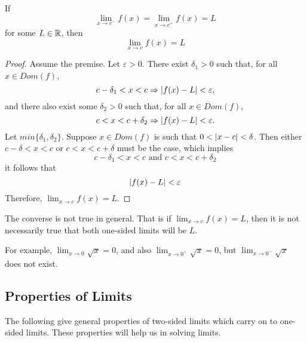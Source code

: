 \begin{thm}
     If
    \begin{equation*}
        \lim \limits_{x \to c^-} f(x) =\lim \limits_{x \to c^+} f(x)=L
    \end{equation*}
    for some $L \in \mathbb{R}$, then 
    \begin{equation*}
        \lim \limits_{x \to c} f(x) =L
    \end{equation*}
    \begin{proof}
         Assume the premise. Let $\varepsilon >0$. There exist $\delta_1>0$ such
         that, for all $x \in Dom(f)$,
         \begin{equation*}
             c- \delta_1<x<c \Rightarrow \left\lvert f(x)-L\right\rvert<\varepsilon,
         \end{equation*}
         and there also exist some $\delta_2>0$ such that, for all $x\in Dom(f)$,
         \begin{equation*}
             c<x<c+\delta_2 \Rightarrow \left\lvert f(x)-L\right\rvert<\varepsilon.
         \end{equation*}
         Let $min\{\delta_1,\delta_2\}$. Suppose $x \in Dom(f)$ is such that
         $0<\left\lvert x-c\right\rvert<\delta$. Then either $c-\delta<x<c$ or $c<x<c+\delta$ must
         be the case, which implies
         \begin{equation*}
             c-\delta_1<x<c \text{ and } c<x<c+\delta_2
         \end{equation*}
         it follows that
         \begin{equation*}
             \left\lvert f(x)-L\right\rvert<\varepsilon
         \end{equation*}
         Therefore, $\lim_{x \to c} f(x)=L$.
    \end{proof}
\end{thm}
\begin{remark}
     The converse is not true in general. That is if $\lim_{x \to c} f(x)=L$,
     then it is not necessarily true that both one-sided limits will be $L$.

     For example, $\lim_{x \to 0} \sqrt{x} = 0$, and also $\lim_{x \to 0^+} \sqrt{x}
     = 0$, but $\lim_{x \to 0^-} \sqrt{x}$ does not exist.
\end{remark}

\newpage
\subsection{Properties of Limits}
The following give general properties of two-sided limits which carry on to
one-sided limits. These properties will help us in solving limits.


